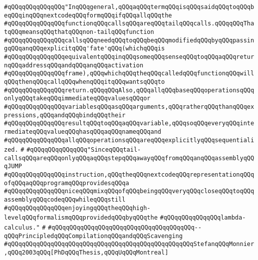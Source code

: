 \verb|#qQQqqQQqqQQqqQQq"InqQQqgeneral,qQQqaqQQqtermqQQqisqQQqsaidqQQqtoqQQqbeqQQqinqQQqnextcodeqQQqformqQQqifqQQqallqQQqthe|\newline
\verb|#qQQqqQQqqQQqqQQqfunctionqQQqcallsqQQqareqQQqtailqQQqcalls.qQQqqQQqThatqQQqmeansqQQqthatqQQqnon-tailqQQqfunction|\newline
\verb|#qQQqqQQqqQQqqQQqcallsqQQqneedqQQqtoqQQqbeqQQqmodifiedqQQqbyqQQqpassingqQQqanqQQqexplicitqQQq'fate'qQQq(whichqQQqis|\newline
\verb|#qQQqqQQqqQQqqQQqequivalentqQQqinqQQqsomeqQQqsenseqQQqtoqQQqaqQQqreturnqQQqaddressqQQqandqQQqanqQQqactivation|\newline
\verb|#qQQqqQQqqQQqqQQqframe),qQQqwhichqQQqtheqQQqcalledqQQqfunctionqQQqwillqQQqthenqQQqcallqQQqwhenqQQqitqQQqwantsqQQqto|\newline
\verb|#qQQqqQQqqQQqqQQqreturn.qQQqqQQqAlso,qQQqallqQQqbaseqQQqoperationsqQQqonlyqQQqtakeqQQqimmediateqQQqvaluesqQQqor|\newline
\verb|#qQQqqQQqqQQqqQQqvariablesqQQqasqQQqarguments,qQQqratherqQQqthanqQQqexpressions,qQQqandqQQqbindqQQqtheir|\newline
\verb|#qQQqqQQqqQQqqQQqresultqQQqtoqQQqaqQQqvariable,qQQqsoqQQqeveryqQQqintermediateqQQqvalueqQQqhasqQQqaqQQqnameqQQqand|\newline
\verb|#qQQqqQQqqQQqqQQqallqQQqoperationsqQQqareqQQqexplicitlyqQQqsequentialized.|\newline
\verb|#|\newline
\verb|#qQQqqQQqqQQqqQQq"SinceqQQqtail-callsqQQqareqQQqonlyqQQqaqQQqstepqQQqawayqQQqfromqQQqanqQQqassemblyqQQqJUMP|\newline
\verb|#qQQqqQQqqQQqqQQqinstruction,qQQqtheqQQqnextcodeqQQqrepresentationqQQqofqQQqaqQQqprogramqQQqprovidesqQQqa|\newline
\verb|#qQQqqQQqqQQqqQQqniceqQQqmixqQQqofqQQqbeingqQQqveryqQQqcloseqQQqtoqQQqassemblyqQQqcodeqQQqwhileqQQqstill|\newline
\verb|#qQQqqQQqqQQqqQQqenjoyingqQQqtheqQQqhigh-levelqQQqformalismqQQqprovidedqQQqbyqQQqthe|\newline
\verb|#qQQqqQQqqQQqqQQqlambda-calculus."|\newline
\verb|#|\newline
\verb|#qQQqqQQqqQQqqQQqqQQqqQQqqQQqqQQqqQQqqQQq--qQQqPrincipledqQQqCompilationqQQqandqQQqScavenging|\newline
\verb|#qQQqqQQqqQQqqQQqqQQqqQQqqQQqqQQqqQQqqQQqqQQqqQQqqQQqStefanqQQqMonnier,qQQq2003qQQq[PhDqQQqThesis,qQQqUqQQqMontreal]|\newline
